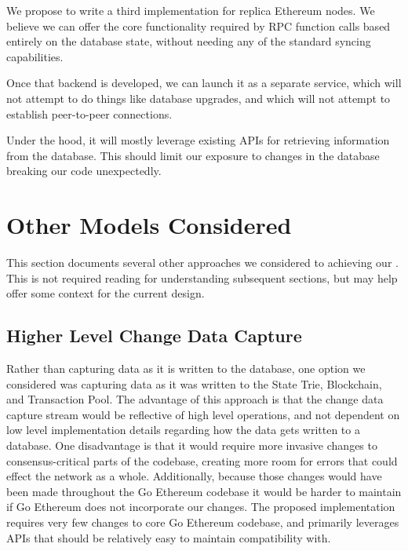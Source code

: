 \documentclass[letterpaper,10pt,english]{sphinxmanual}
\begin{document}
We propose to write a third implementation for replica Ethereum nodes. We
believe we can offer the core functionality required by RPC function calls
based entirely on the database state, without needing any of the standard
syncing capabilities.

Once that backend is developed, we can launch it as a separate service, which
will not attempt to do things like database upgrades, and which will not
attempt to establish peer-to-peer connections.

Under the hood, it will mostly leverage existing APIs for retrieving
information from the database. This should limit our exposure to changes in the
database breaking our code unexpectedly.


\section{Other Models Considered}
\label{\detokenize{topics/approach:other-models-considered}}
This section documents several other approaches we considered to achieving our
{\hyperref[\detokenize{topics/goals:design-goals}]{}}. This is not required reading for understanding subsequent
sections, but may help offer some context for the current design.


\subsection{Higher Level Change Data Capture}
\label{\detokenize{topics/approach:higher-level-change-data-capture}}
Rather than capturing data as it is written to the database, one option we
considered was capturing data as it was written to the State Trie, Blockchain,
and Transaction Pool. The advantage of this approach is that the change data
capture stream would be reflective of high level operations, and not dependent
on low level implementation details regarding how the data gets written to a
database. One disadvantage is that it would require more invasive changes to
consensus-critical parts of the codebase, creating more room for errors that
could effect the network as a whole. Additionally, because those changes would
have been made throughout the Go Ethereum codebase it would be harder to
maintain if Go Ethereum does not incorporate our changes. The proposed
implementation requires very few changes to core Go Ethereum codebase, and
primarily leverages APIs that should be relatively easy to maintain
compatibility with.
\end{document}
